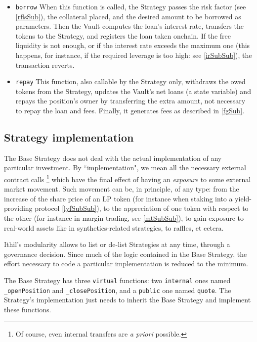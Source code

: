 \documentclass[a4paper,10 pt]{article}
\theoremstyle{definition}
\begin{document}
\begin{itemize}
\item \verb|borrow| When this function is called, the Strategy passes the risk factor (see \ref{rflsSub}), the collateral placed, and the desired amount to be borrowed as parameters. Then the Vault computes the loan's interest rate, transfers the tokens to the Strategy, and registers the loan taken onchain. If the free liquidity is not enough, or if the interest rate exceeds the maximum one (this happens, for instance, if the required leverage is too high: see \ref{irSubSub}), the transaction reverts.
\item \verb|repay| This function, also callable by the Strategy only, withdraws the owed tokens from the Strategy, updates the Vault's net loans (a state variable) and repays the position's owner by transferring the extra amount, not necessary to repay the loan and fees. Finally, it generates fees as described in \ref{fgSub}.
\end{itemize}

\subsection{Strategy implementation}\label{siSub}
The Base Strategy does not deal with the actual implementation of any particular investment. By ``implementation", we mean all the necessary external contract calls \footnote{Of course, even internal transfers are {\it a priori} possible.} which have the final effect of having an {\it exposure} to some external market movement. Such movement can be, in principle, of any type: from the increase of the share price of an LP token (for instance when staking into a yield-providing protocol \ref{lyfSubSub}), to the appreciation of one token with respect to the other (for instance in margin trading, see \ref{mtSubSub}), to gain exposure to real-world assets like in synthetics-related strategies, to raffles, et cetera.

Ithil's modularity allows to list or de-list Strategies at any time, through a governance decision. Since much of the logic contained in the Base Strategy, the effort necessary to code a particular implementation is reduced to the minimum.

The Base Strategy has three \verb|virtual| functions: two \verb|internal| ones named \verb|_openPosition| and \verb|_closePosition|, and a \verb|public| one named \verb|quote|. The Strategy's implementation just needs to inherit the Base Strategy and implement these functions.
\end{document}
